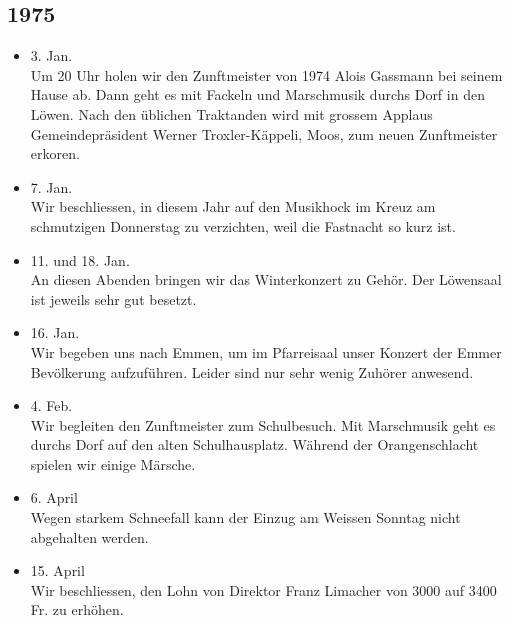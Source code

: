 \subsection{1975}

\begin{history}

    \begin{itemize}

        \item 3. Jan.\\
              Um 20 Uhr holen wir den Zunftmeister von 1974 Alois Gassmann bei seinem
              Hause ab. Dann geht es mit Fackeln und Marschmusik durchs Dorf in den
              Löwen. Nach den üblichen Traktanden wird mit grossem Applaus
              Gemeindepräsident Werner Troxler-Käppeli, Moos, zum neuen Zunftmeister
              erkoren.

        \item 7. Jan.\\
              Wir beschliessen, in diesem Jahr auf den Musikhock im Kreuz am
              schmutzigen Donnerstag zu verzichten, weil die Fastnacht so kurz ist.

        \item 11. und 18. Jan.\\
              An diesen Abenden bringen wir das Winterkonzert zu Gehör. Der Löwensaal
              ist jeweils sehr gut besetzt.

        \item 16. Jan.\\
              Wir begeben uns nach Emmen, um im Pfarreisaal unser Konzert der Emmer
              Bevölkerung aufzuführen. Leider sind nur sehr wenig Zuhörer anwesend.

        \item 4. Feb.\\
              Wir begleiten den Zunftmeister zum Schulbesuch. Mit Marschmusik geht es
              durchs Dorf auf den alten Schulhausplatz. Während der Orangenschlacht
              spielen wir einige Märsche.

        \item 6. April\\
              Wegen starkem Schneefall kann der Einzug am Weissen Sonntag nicht
              abgehalten werden.

        \item 15. April\\
              Wir beschliessen, den Lohn von Direktor Franz Limacher von 3000 auf 3400
              Fr. zu erhöhen.


\end{itemize}
\end{history}
